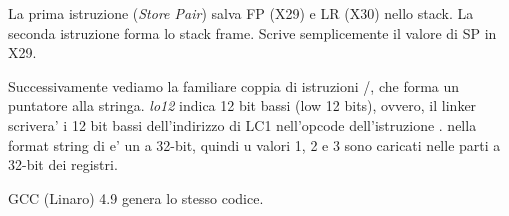 





La prima istruzione  (\emph{Store Pair}) salva \ac{FP} (X29) e \ac{LR} (X30) nello stack.
La seconda istruzione  forma lo stack frame.
Scrive semplicemente il valore di \ac{SP} in X29.

Successivamente vediamo la familiare coppia di istruzioni /\ADD , che forma un puntatore alla stringa.
\emph{lo12} indica 12 bit bassi (low 12 bits), ovvero, il linker scrivera' i 12 bit bassi dell'indirizzo di LC1 nell'opcode dell'istruzione \ADD .
 nella format string di \printf e' un \Tint a 32-bit, quindi u valori 1, 2 e 3 sono caricati nelle parti a 32-bit dei registri.

\Optimizing GCC (Linaro) 4.9 genera lo stesso codice.
